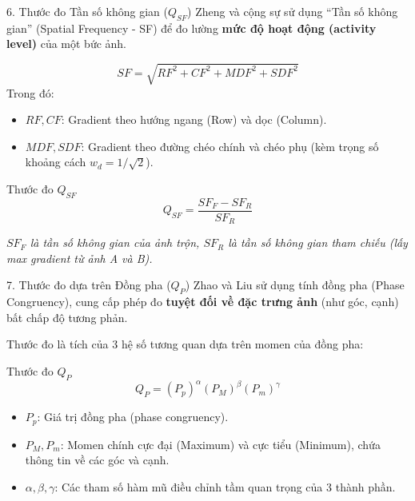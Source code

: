 \documentclass{beamer}
\begin{document}
\begin{frame}{6. Thước đo Tần số không gian ($Q_{SF}$)}
    Zheng và cộng sự sử dụng ``Tần số không gian'' (Spatial Frequency - SF) để đo lường \textbf{mức độ hoạt động (activity level)} của một bức ảnh.

    \begin{equation}
        SF = \sqrt{RF^2 + CF^2 + MDF^2 + SDF^2}
    \end{equation}
    Trong đó:
    \begin{itemize}
        \item $RF, CF$: Gradient theo hướng ngang (Row) và dọc (Column).
        \item $MDF, SDF$: Gradient theo đường chéo chính và chéo phụ (kèm trọng số khoảng cách $w_d = 1/\sqrt{2}$).
    \end{itemize}

    \begin{block}{Thước đo $Q_{SF}$}
    \begin{equation}
        Q_{SF} = \frac{SF_F - SF_R}{SF_R}
    \end{equation}
    \end{block}
    \footnotesize{\textit{$SF_F$ là tần số không gian của ảnh trộn, $SF_R$ là tần số không gian tham chiếu (lấy max gradient từ ảnh A và B).}}
\end{frame}

\begin{frame}{7. Thước đo dựa trên Đồng pha ($Q_P$)}
    Zhao và Liu sử dụng tính đồng pha (Phase Congruency), cung cấp phép đo \textbf{tuyệt đối về đặc trưng ảnh} (như góc, cạnh) bất chấp độ tương phản.

    Thước đo là tích của 3 hệ số tương quan dựa trên momen của đồng pha:
    \begin{block}{Thước đo $Q_P$}
    \begin{equation}
        Q_P = (P_p)^\alpha (P_M)^\beta (P_m)^\gamma
    \end{equation}
    \end{block}

    \begin{itemize}
        \item $P_p$: Giá trị đồng pha (phase congruency).
        \item $P_M, P_m$: Momen chính cực đại (Maximum) và cực tiểu (Minimum), chứa thông tin về các góc và cạnh.
        \item $\alpha, \beta, \gamma$: Các tham số hàm mũ điều chỉnh tầm quan trọng của 3 thành phần.
    \end{itemize}
\end{frame}
\end{document}
